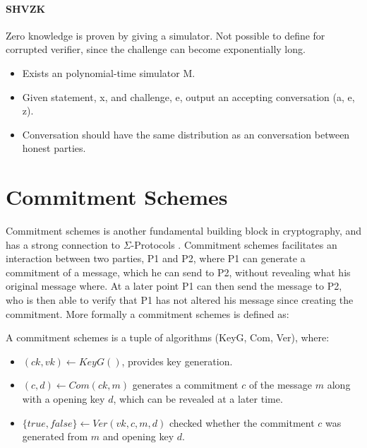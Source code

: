 \paragraph{SHVZK}
Zero knowledge is proven by giving a simulator. Not possible to define for
corrupted verifier, since the challenge can become exponentially long.
\begin{itemize}
  \item Exists an polynomial-time simulator M.
  \item Given statement, x, and challenge, e, output an accepting
    conversation (a, e, z).
  \item Conversation should have the same distribution as an conversation
    between honest parties.
\end{itemize}




\section{Commitment Schemes}
\label{sec:background:commitment}
Commitment schemes is another fundamental building block in cryptography, and
has a strong connection to $\Sigma$-Protocols . Commitment
schemes facilitates an interaction between two parties, P1 and P2, where P1 can
generate a commitment of a message, which he can send to P2, without revealing
what his original message where. At a later point P1 can then send the message
to P2, who is then able to verify that P1 has not altered his message since
creating the commitment. More formally a commitment schemes is defined as:

\begin{definition}
A commitment schemes is a tuple of algorithms (KeyG, Com, Ver), where:
\begin{itemize}
  \item $(ck, vk) \leftarrow KeyG()$, provides key generation.
  \item $(c, d) \leftarrow Com(ck, m)$ generates a commitment $c$ of the message
    $m$ along with a opening key $d$, which can be revealed at a later time.
  \item $\{true, false\} \leftarrow Ver(vk, c, m, d)$ checked whether the
    commitment $c$ was generated from $m$ and opening key $d$.
\end{itemize}
\end{definition}

